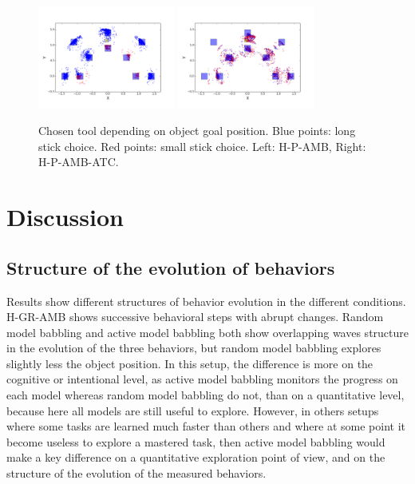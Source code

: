 \documentclass[10pt,letterpaper]{article}
\begin{document}
		\begin{figure}[ht]
			\centering
			\includegraphics[width=4.5cm]{./include/H-RGB-P-AMB-log9-choice_mod4.png}
			\hspace{-0.6cm}
			\includegraphics[width=4.5cm]{./include/H-RGB-P-AMB-PGITC-log3-choice_mod4.png}
			\caption{Chosen tool depending on object goal position. Blue points: long stick choice. Red points: small stick choice. Left: H-P-AMB, Right: H-P-AMB-ATC.}
			\label{res_choice}
		\end{figure}
		
	
%


\section{Discussion}

	\subsection{Structure of the evolution of behaviors}
	
		Results show different structures of behavior evolution in the different conditions.
		H-GR-AMB shows successive behavioral steps with abrupt changes.
		Random model babbling and active model babbling both show overlapping waves structure in the evolution of the three behaviors, 
		but random model babbling explores slightly less the object position.
		In this setup, the difference is more on the cognitive or intentional level, as active model babbling monitors the progress on each model whereas random model babbling do not, than on a quantitative level, 
		because here all models are still useful to explore.
		However, in others setups where some tasks are learned much faster than others and where at some point it become useless to explore a mastered task, then active model babbling would
		make a key difference on a quantitative exploration point of view, and on the structure of the evolution of the measured behaviors.
	
\end{document}
